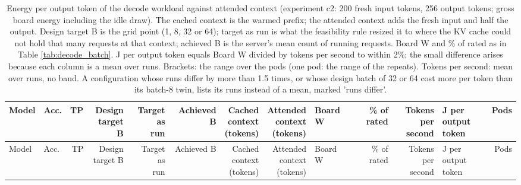 \begin{landscape}
\begingroup
\scriptsize
\setlength{\tabcolsep}{3pt}
\begin{longtable}{llrrrrrrlrrlr}
\caption{Energy per output token of the decode workload against attended context (experiment c2: 200 fresh input tokens, 256 output tokens; gross board energy including the idle draw). The cached context is the warmed prefix; the attended context adds the fresh input and half the output. Design target B is the grid point (1, 8, 32 or 64); target as run is what the feasibility rule resized it to where the KV cache could not hold that many requests at that context; achieved B is the server's mean count of running requests. Board W and \% of rated as in Table \ref{tab:decode_batch}. J per output token equals Board W divided by tokens per second to within 2\%; the small difference arises because each column is a mean over runs. Brackets: the range over the pods (one pod: the range of the repeats). Tokens per second: mean over runs, no band. A configuration whose runs differ by more than 1.5 times, or whose design batch of 32 or 64 cost more per token than its batch-8 twin, lists its runs instead of a mean, marked 'runs differ'.}\label{tab:decode_context}\\
\toprule
Model & Acc. & TP & \makecell[r]{Design\\target B} & \makecell[r]{Target as\\run} & Achieved B & \makecell[r]{Cached\\context\\(tokens)} & \makecell[r]{Attended\\context\\(tokens)} & Board W & \% of rated & \makecell[r]{Tokens per\\second} & \makecell[l]{J per output\\token} & Pods \\
\midrule
\endfirsthead
\toprule
Model & Acc. & TP & \makecell[r]{Design\\target B} & \makecell[r]{Target as\\run} & Achieved B & \makecell[r]{Cached\\context\\(tokens)} & \makecell[r]{Attended\\context\\(tokens)} & Board W & \% of rated & \makecell[r]{Tokens per\\second} & \makecell[l]{J per output\\token} & Pods \\

\end{longtable}
\end{landscape}
